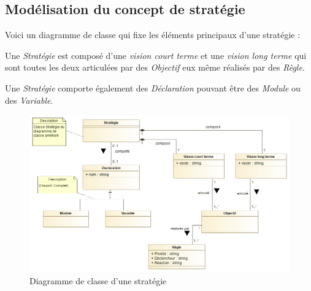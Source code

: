 
\subsection{Modélisation du concept de stratégie}
\label{sec:question7}

Voici un diagramme de classe qui fixe les éléments principaux d'une stratégie :

Une \emph{Stratégie} est composé d'une \emph{vision court terme} et une \emph{vision long terme} qui sont toutes les deux articulées par des \emph{Objectif} eux même réalisés par des \emph{Règle}.

Une \emph{Stratégie} comporte également des \emph{Déclaration} pouvant être des \emph{Module} ou des \emph{Variable}.

\begin{figure}
	\centering
	\includegraphics[width=500pt]{assets/strat_base}
	\caption{Diagramme de classe d'une stratégie}
	\label{fig:strategie}
\end{figure}